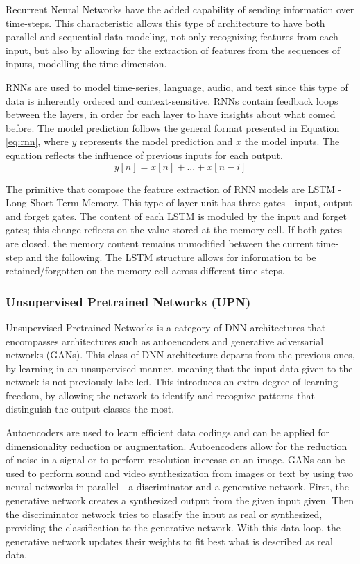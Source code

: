 Recurrent Neural Networks have the added capability of sending information over time-steps. This characteristic allows this type of architecture to have both parallel and sequential data modeling, not only recognizing features from each input, but also by allowing for the extraction of features from the sequences of inputs, modelling the time dimension. 

RNNs are used to model time-series, language, audio, and text since this type of data is inherently ordered and context-sensitive. RNNs contain feedback loops between the layers, in order for each layer to have insights about what comed before. The model prediction follows the general format presented in Equation \ref{eq:rnn}, where $y$ represents the model prediction and $x$ the model inputs. The equation reflects the influence of previous inputs for each output.
\begin{equation}
    \label{eq:rnn}
    y[n] = x[n] + ... + x[n-i]
\end{equation}

The primitive that compose the feature extraction of RNN models are LSTM - Long Short Term Memory. This type of layer unit has three gates - input, output and forget gates. The content of each LSTM is moduled by the input and forget gates; this change reflects on the value stored at the memory cell. If both gates are closed, the memory content remains unmodified between the current time-step and the following. The LSTM structure allows for information to be retained/forgotten on the memory cell across different time-steps.


\subsubsection{Unsupervised Pretrained Networks (UPN)}
Unsupervised Pretrained Networks is a category of DNN architectures that encompasses architectures such as autoencoders and generative adversarial networks (GANs). This class of DNN architecture departs from the previous ones, by learning in an unsupervised manner, meaning that the input data given to the network is not previously labelled. This introduces an extra degree of learning freedom, by allowing the network to identify and recognize patterns that distinguish the output classes the most.

Autoencoders are used to learn efficient data codings and can be applied for dimensionality reduction or augmentation. Autoencoders allow for the reduction of noise in a signal or to perform resolution increase on an image. GANs can be used to perform sound and video synthesization from images or text by using two neural networks in parallel - a discriminator and a generative network. First, the generative network creates a synthesized output from the given input given. Then the discriminator network tries to classify the input as real or synthesized, providing the classification to the generative network. With this data loop, the generative network updates their weights to fit best what is described as real data.



